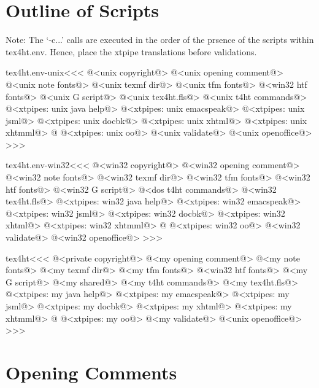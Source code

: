 \documentclass{article}
\begin{document}
\section{Outline of Scripts}

Note: The `-c...' calls are executed in the order of the prsence of
the scripts within tex4ht.env.  Hence, place the xtpipe translations
before validations.


\<tex4ht.env-unix\><<<
@<unix copyright@>%
@<unix opening comment@>%
@<unix note fonts@>%
@<unix texmf dir@>%
@<unix tfm fonts@>%
@<win32 htf fonts@>%
@<unix G script@>%
@<unix tex4ht.fls@>%
@<unix t4ht commands@>%
@<xtpipes: unix java help@>
@<xtpipes: unix emacspeak@>
@<xtpipes: unix jsml@>
@<xtpipes: unix docbk@>
@<xtpipes: unix xhtml@> 
@<xtpipes: unix xhtmml@> @%
@<xtpipes: unix oo@>%
@<unix validate@> %
@<unix openoffice@>%
>>>


\<tex4ht.env-win32\><<<
@<win32 copyright@>%
@<win32 opening comment@>%
@<win32 note fonts@>%
@<win32 texmf dir@>%
@<win32 tfm fonts@>%
@<win32 htf fonts@>%
@<win32 G script@>%
@<dos t4ht commands@>%
@<win32 tex4ht.fls@>%
@<xtpipes: win32 java help@>
@<xtpipes: win32 emacspeak@>
@<xtpipes: win32 jsml@>
@<xtpipes: win32 docbk@>
@<xtpipes: win32 xhtml@> 
@<xtpipes: win32 xhtmml@> @%
@<xtpipes: win32 oo@>%
@<win32 validate@> %
@<win32 openoffice@>%
>>>



\<tex4ht\><<<
@<private copyright@>%
@<my opening comment@>%
@<my note fonts@>%
@<my texmf dir@>%
@<my tfm fonts@>%
@<win32 htf fonts@>%
@<my G script@>%
@<my shared@>%
@<my t4ht commands@>%
@<my tex4ht.fls@>%
@<xtpipes: my java help@>
@<xtpipes: my emacspeak@>
@<xtpipes: my jsml@>
@<xtpipes: my docbk@>
@<xtpipes: my xhtml@>
@<xtpipes: my xhtmml@>  @%
@<xtpipes: my oo@>
@<my validate@> %
@<unix openoffice@>%
>>>





\section{Opening Comments}
\end{document}
